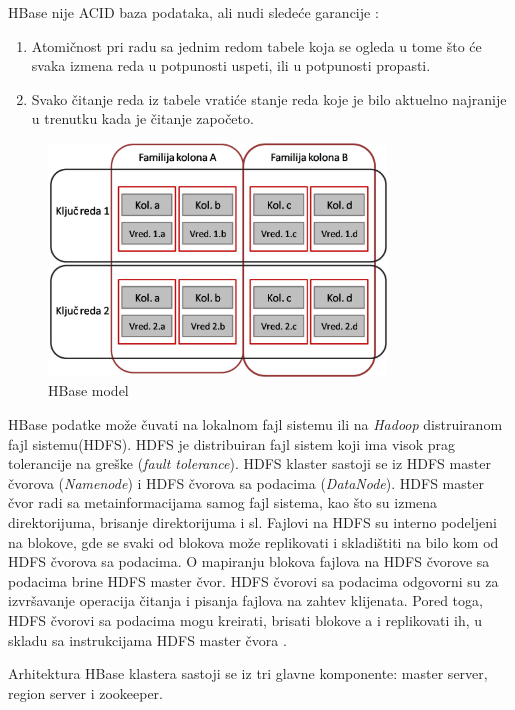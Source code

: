 \documentclass[12pt,oneside]{memoir}
\begin{document}
HBase nije ACID baza podataka, ali nudi sledeće garancije \cite{hbaseACID}: 

\begin{enumerate}
\item[\textbullet] Atomičnost pri radu sa jednim redom tabele koja se ogleda u tome što će svaka izmena reda u potpunosti uspeti, ili u potpunosti propasti.
\item[\textbullet] Svako čitanje reda iz tabele vratiće stanje reda koje je bilo aktuelno najranije u trenutku kada je čitanje započeto. 
\end{enumerate}

\begin{figure}[!ht]
  \centering
  \includegraphics[width=0.8\textwidth]{colFamily.png}
  \caption{HBase model}
  \label{fig:grafikon}
\end{figure}

HBase podatke može čuvati na lokalnom fajl sistemu ili na \textit{Hadoop} distruiranom fajl sistemu(HDFS). HDFS je distribuiran fajl sistem koji ima visok prag tolerancije na greške (\textit{fault tolerance}). HDFS klaster sastoji se iz HDFS master čvorova (\textit{Namenode}) i HDFS čvorova sa podacima (\textit{DataNode}). HDFS master čvor radi sa metainformacijama samog fajl sistema, kao što su izmena direktorijuma, brisanje direktorijuma i sl. Fajlovi na HDFS su interno podeljeni na blokove, gde se svaki od blokova može replikovati i skladištiti na bilo kom od HDFS čvorova sa podacima. O mapiranju blokova fajlova na HDFS čvorove sa podacima brine HDFS master čvor. HDFS čvorovi sa podacima odgovorni su za izvršavanje operacija čitanja i pisanja fajlova na zahtev klijenata. Pored toga, HDFS čvorovi sa podacima mogu kreirati, brisati blokove a i replikovati ih, u skladu sa instrukcijama HDFS master čvora \cite{hdfs}.

Arhitektura HBase klastera sastoji se iz tri glavne komponente: master server, region server i zookeeper.
\end{document}
